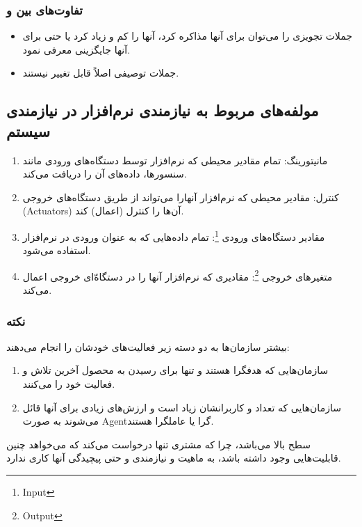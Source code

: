 \subsubsection{تفاوت‌های بین  و }

\begin{itemize}
    \item جملات تجویزی را می‌توان برای آنها مذاکره کرد، آنها را کم و زیاد کرد یا
    حتی برای آنها جایگزینی معرفی نمود.
    \item جملات توصیفی اصلاً قابل تغییر نیستند.
\end{itemize}

\subsection{مولفه‌های مربوط به نیازمندی نرم‌افزار در نیازمندی سیستم}

\begin{enumerate}
    \item مانیتورینگ: تمام مقادیر محیطی که نرم‌افزار توسط دستگاه‌های ورودی مانند
    سنسور‌ها، داده‌های آن را دریافت می‌کند.
    \item کنترل: مقادیر محیطی که نرم‌افزار آنهارا می‌تواند از طریق دستگاه‌های
    خروجی (Actuators) آن‌ها را کنترل (اعمال) کند.
    \item مقادیر دستگاه‌های ورودی \footnote{Input}: تمام داده‌هایی که به عنوان
    ورودی در نرم‌افزار استفاده می‌شود.
    \item متغیر‌های خروجی \footnote{Output}: مقادیری که نرم‌افزار آنها را در
    دستگاه‌ّای خروجی اعمال می‌کند.
\end{enumerate}

\subsubsection*{نکته}

بیشتر سازمان‌ها به دو دسته زیر فعالیت‌های خودشان را انجام می‌دهند:

\begin{enumerate}
    \item سازمان‌هایی که هدفگرا هستند و تنها برای رسیدن به محصول آخرین تلاش و
    فعالیت خود را می‌کنند.
    \item سازمان‌هایی که تعداد  و کاربرانشان زیاد است و ارزش‌های زیادی
    برای آنها قائل می‌شوند به صورت Agentگرا یا عاملگرا هستند.
\end{enumerate}

سطح  بالا می‌باشد، چرا که مشتری تنها درخواست می‌کند که
می‌خواهد چنین قابلیت‌هایی وجود داشته باشد، به ماهیت و نیازمندی و حتی پیچیدگی
آنها کاری ندارد.

